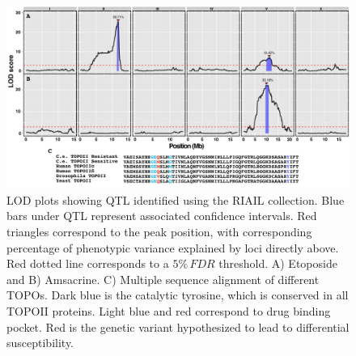 \documentclass[12pt]{article}
\begin{document}
\begin{figure}[h]
\centering
\captionsetup{font=tiny}
\includegraphics[scale=0.45]{Figures/Figure1.pdf}
\vspace{-5pt}
\caption[LOD plots for TOPOII inhibitors]{LOD plots showing QTL identified using the RIAIL collection. Blue bars under QTL represent associated confidence intervals. Red triangles correspond to the peak position, with corresponding percentage of phenotypic variance explained by loci directly above. Red dotted line corresponds to a $5\%\,FDR$ threshold. A) Etoposide and B) Amsacrine. C) Multiple sequence alignment of different TOPOs. Dark blue is the catalytic tyrosine, which is conserved in all TOPOII proteins. Light blue and red correspond to drug binding pocket. Red is the genetic variant hypothesized to lead to differential susceptibility.}
\label{LODplot}
\end{figure}
\newpage

\end{document}

